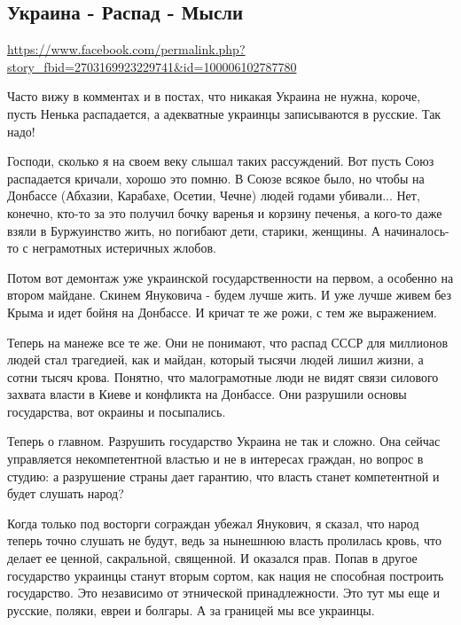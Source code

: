  
 
 
 
 

\subsection{Украина - Распад - Мысли}
\label{sec:16_05_2020.fb.zharkih_denis.1.ukraina_raspad}
\url{https://www.facebook.com/permalink.php?story_fbid=2703169923229741&id=100006102787780}

Часто вижу в комментах и в постах, что никакая Украина не нужна, короче, пусть
Ненька распадается, а адекватные украинцы записываются в русские. Так надо! 

Господи, сколько я на своем веку слышал таких рассуждений. Вот пусть Союз
распадается кричали, хорошо это помню. В Союзе всякое было, но чтобы на
Донбассе (Абхазии, Карабахе, Осетии, Чечне) людей годами убивали... Нет,
конечно, кто-то за это получил бочку варенья и корзину печенья, а кого-то даже
взяли в Буржуинство жить, но погибают дети, старики, женщины. А начиналось-то с
неграмотных истеричных жлобов. 

Потом вот демонтаж уже украинской государственности на первом, а особенно на
втором майдане. Скинем Януковича - будем лучше жить. И уже лучше живем без
Крыма и идет бойня на Донбассе. И кричат те же рожи, с тем же выражением. 

Теперь на манеже все те же. Они не понимают, что распад СССР для миллионов
людей стал трагедией, как и майдан, который тысячи людей лишил жизни, а сотни
тысяч крова. Понятно, что малограмотные люди не видят связи силового захвата
власти в Киеве и конфликта на Донбассе. Они разрушили основы государства, вот
окраины и посыпались. 

Теперь о главном. Разрушить государство Украина не так и сложно. Она сейчас
управляется некомпетентной властью и не в интересах граждан, но вопрос в
студию: а разрушение страны дает гарантию, что власть станет компетентной и
будет слушать народ?

Когда только под восторги сограждан убежал Янукович, я сказал, что народ теперь
точно слушать не будут, ведь за нынешнюю власть пролилась кровь, что делает ее
ценной, сакральной, священной. И оказался прав. Попав в другое государство
украинцы станут вторым сортом, как нация не способная построить государство.
Это независимо от этнической принадлежности. Это тут мы еще и русские, поляки,
евреи и болгары. А за границей мы все украинцы. 

